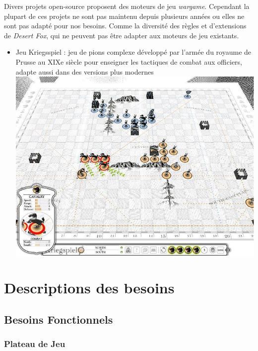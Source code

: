 \documentclass{article}[a4paper, 12pt]
\begin{document}
Divers projets open-source proposent des moteurs de jeu \emph{wargame}. Cependant la plupart de ces projets ne sont pas maintenu depuis plusieurs années ou elles ne sont pas adapté pour nos besoins. Comme la diversité des règles et d'extensions de \emph{Desert Fox}, qui ne peuvent pas être adapter aux moteurs de jeu existants.

\begin{itemize}
    \item Jeu Kriegsspiel : jeu de pions complexe développé par l'armée du royaume de Prusse au XIXe siècle pour enseigner les tactiques de combat aux officiers, adapte aussi dans des versions plus modernes \cite{livermore1879american}\\
    \includegraphics[scale=0.5]{kriegspiel.jpeg}
    
    
\end{itemize}


\section{Descriptions des besoins}
\subsection{Besoins Fonctionnels}
\subsubsection{Plateau de Jeu}
\end{document}
